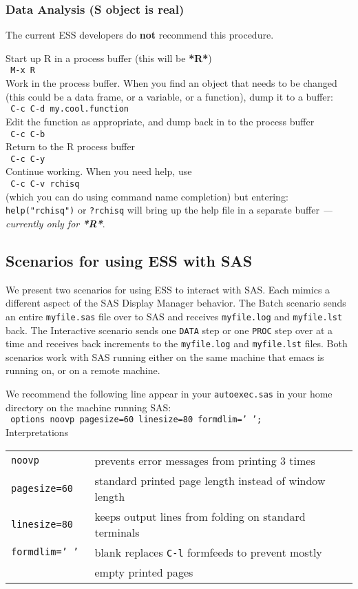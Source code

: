 \documentclass{article}
\newcommand{\elcode}[1]{\\{\tt\hspace*{2em} #1}\\}
\begin{document}
\subsubsection{Data Analysis (S object is real)}
The current ESS developers do {\bf not} recommend this procedure.

\noindent
Start up R in a process buffer (this will be \textbf{*R*}) 
  \elcode{M-x R}
Work in the process buffer.  When you find an object that needs
to be changed (this could be a data frame, or a variable,
or a function), dump it to a buffer:
  \elcode{C-c C-d my.cool.function}
Edit the function as appropriate, and dump back in to the
process buffer
  \elcode{C-c C-b}
Return to the R process buffer
  \elcode{C-c C-y}
Continue working.
When you need help, use
  \elcode{C-c C-v rchisq}
(which you can do using command name completion)
but entering:   {\tt help("rchisq")} or {\tt ?rchisq}
will bring up the help file in a separate buffer
\emph{--- currently only for \textbf{*R*}}.



\subsection{Scenarios for using ESS with SAS}
\label{sec:SAS:scen}

We present two scenarios for using ESS to interact with SAS.  Each mimics
a different aspect of the SAS Display Manager behavior.
The Batch scenario sends an entire {\tt myfile.sas} file over to
SAS and receives {\tt myfile.log} and {\tt myfile.lst} back.  The Interactive
scenario sends one {\tt DATA} step or one {\tt PROC} step over at a time
and receives back increments to the {\tt myfile.log} and {\tt myfile.lst} files.
Both scenarios work with SAS running either on the same machine that emacs
is running on, or on a remote machine.

We recommend the following line appear in
your {\tt autoexec.sas} in your home directory on the machine running SAS:
\elcode{options noovp pagesize=60 linesize=80 formdlim=' ';}
Interpretations\\
\begin{tabular}{ll}
\tt   noovp         & prevents error messages from printing 3 times         \\
\tt   pagesize=60   & standard printed page length instead of window length \\
\tt   linesize=80   & keeps output lines from folding on standard terminals \\
\tt   formdlim=' '  & blank replaces {\tt C-l} formfeeds to prevent mostly  \\
\tt                 & empty printed pages                                   \\
\end{tabular}\\
\end{document}

